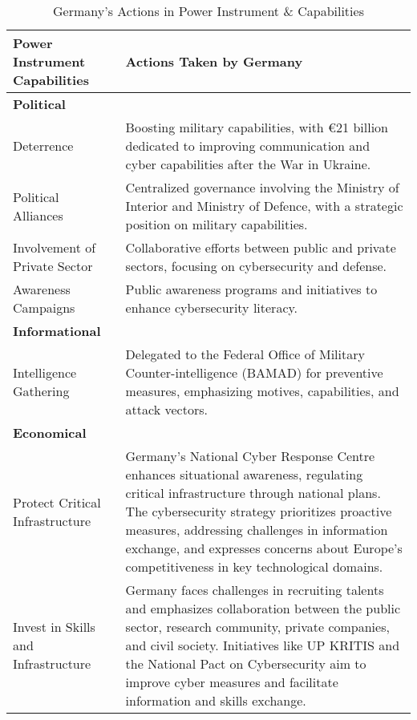 \begin{table}[h]
    \centering
    \renewcommand{\arraystretch}{1.5} %
    \caption{Germany's Actions in Power Instrument \& Capabilities}
    \begin{tabular}{>{\raggedright}p{4cm} p{11cm}}
        \toprule
        \textbf{Power Instrument Capabilities} & \textbf{Actions Taken by Germany} \\
        \midrule
        \textbf{Political} & \\
        \hspace{0.2cm} Deterrence & Boosting military capabilities, with €21 billion dedicated to improving communication and cyber capabilities after the War in Ukraine. \\
        \hspace{0.2cm} Political Alliances & Centralized governance involving the Ministry of Interior and Ministry of Defence, with a strategic position on military capabilities. \\
        \hspace{0.2cm} Involvement of Private Sector & Collaborative efforts between public and private sectors, focusing on cybersecurity and defense. \\
        \hspace{0.2cm} Awareness Campaigns & Public awareness programs and initiatives to enhance cybersecurity literacy. \\
        \midrule
        \textbf{Informational} & \\
        \hspace{0.2cm} Intelligence Gathering & Delegated to the Federal Office of Military Counter-intelligence (BAMAD) for preventive measures, emphasizing motives, capabilities, and attack vectors. \\
        \midrule
        \textbf{Economical} & \\
        \hspace{0.2cm} Protect Critical Infrastructure & Germany's National Cyber Response Centre enhances situational awareness, regulating critical infrastructure through national plans. The cybersecurity strategy prioritizes proactive measures, addressing challenges in information exchange, and expresses concerns about Europe's competitiveness in key technological domains. \\
        \hspace{0.2cm} Invest in Skills and Infrastructure & Germany faces challenges in recruiting talents and emphasizes collaboration between the public sector, research community, private companies, and civil society. Initiatives like UP KRITIS and the National Pact on Cybersecurity aim to improve cyber measures and facilitate information and skills exchange. \\

\end{tabular}
\end{table}

